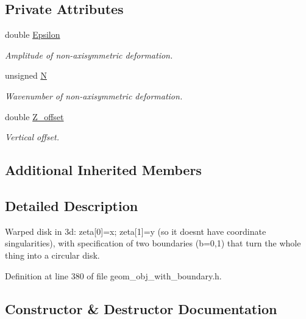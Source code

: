 \subsection*{Private Attributes}
\begin{DoxyCompactItemize}
\item 
double \hyperlink{classoomph_1_1WarpedCircularDisk_a1b247844e433658dd5b829220543ac78}{Epsilon}
\begin{DoxyCompactList}\small\item\em Amplitude of non-\/axisymmetric deformation. \end{DoxyCompactList}\item 
unsigned \hyperlink{classoomph_1_1WarpedCircularDisk_ab2c77c18aedee5f502637dfbf96c0794}{N}
\begin{DoxyCompactList}\small\item\em Wavenumber of non-\/axisymmetric deformation. \end{DoxyCompactList}\item 
double \hyperlink{classoomph_1_1WarpedCircularDisk_a7f07f7318757578b6c703d518174a811}{Z\+\_\+offset}
\begin{DoxyCompactList}\small\item\em Vertical offset. \end{DoxyCompactList}\end{DoxyCompactItemize}
\subsection*{Additional Inherited Members}


\subsection{Detailed Description}
Warped disk in 3d\+: zeta\mbox{[}0\mbox{]}=x; zeta\mbox{[}1\mbox{]}=y (so it doesn\textquotesingle{}t have coordinate singularities), with specification of two boundaries (b=0,1) that turn the whole thing into a circular disk. 

Definition at line 380 of file geom\+\_\+obj\+\_\+with\+\_\+boundary.\+h.



\subsection{Constructor \& Destructor Documentation}
\mbox{\label{classoomph_1_1WarpedCircularDisk_a6dd95f7f2c2240022ae3b1278108e379}} 
